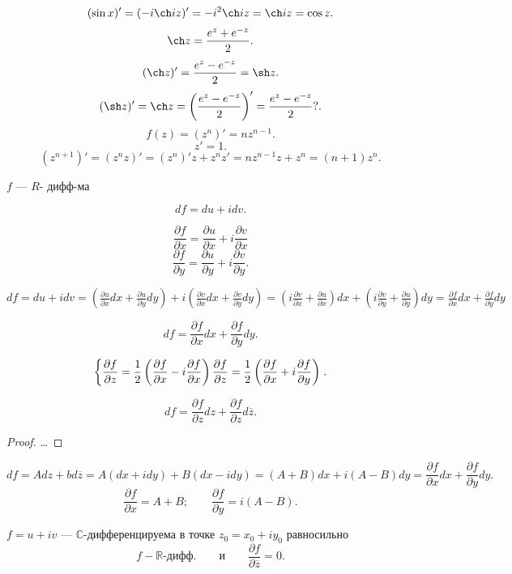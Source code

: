 \[
	(\sin x)'=(-i \ch  i z)'= - i^2 \ch i z = \ch iz= \cos z
.\] 
\[
	\ch z= \frac{e^z+e^{-z}}{2}
.\] 
\[
	(\ch z)'=\frac{e^z - e^{-z}}{2}=\sh z
.\] 
\[
	(\sh z)'=\ch z = \left( \frac{e^z-e^{-z}}{2} \right) '=
	\frac{e^z-e^{-z}}{2}?
.\]
\[
	f(z)=(z^n)'=n z^{n-1}
.\] 
\[
z'=1
.\] 
\[
	(z^{n+1})'=(z^n z)'=(z^n)'z+z^n z'=n z^{n-1}z+z^n=(n+1)z^n
.\] 
\begin{figure}[ht]
    \centering
    \caption{}
    \label{fig:1}
\end{figure}
\begin{dfn}
	$f$ --- $R$- дифф-ма
\end{dfn}
\begin{dfn}
	\[
	df=du+i dv
	.\] 
\end{dfn}
\begin{dfn}
	\[\frac{\partial f}{\partial x} =\frac{\partial u}{\partial x} +i \frac{\partial v}{\partial x} \]
	\[
	\frac{\partial f}{\partial y} =\frac{\partial u}{\partial y} +i \frac{\partial v}{\partial y} 
	.\] 
\end{dfn}

$df=du + idv=\left( \frac{\partial u}{\partial x} dx+
\frac{\partial u}{\partial y} dy\right) +i\left( 
\frac{\partial v}{\partial x} dx+ \frac{\partial v}{\partial y} dy\right) =\left(i \frac{\partial v}{\partial x} +\frac{\partial u}{\partial x}  \right) dx+\left(i \frac{\partial v}{\partial y} +
\frac{\partial u}{\partial y} \right) dy=\frac{\partial f}{\partial x} dx+ \frac{\partial f}{\partial y} dy$ 
\begin{thm}
	\[
	df= \frac{\partial f}{\partial x} dx+\frac{\partial f}{\partial y} dy
	.\] 
\end{thm}
\[\left\{
	\frac{\partial f}{\partial z} = \frac{1}{2}\left(\frac{\partial f}{\partial x} -i \frac{\partial f}{\partial x} \right)\\
	\frac{\partial f}{\partial z} =\frac{1}{2}\left( 
	\frac{\partial f}{\partial x} +i \frac{\partial f}{\partial y} \right) \right.
.\] 
\begin{thm}
	\[
	df=\frac{\partial f}{\partial z} dz+\frac{\partial f}{\partial z} d \overline{z}
	.\] 
\end{thm}
\begin{proof}
	\ldots
\end{proof}
\begin{thm}
	\[
		df=Adz+bd \overline{z} =A(dx+i dy)+
		B(dx-i dy)=(A+B)dx+i (A-B)dy= \frac{\partial f}{\partial x} dx+\frac{\partial f}{\partial y} dy
	.\] 
	\[
	\frac{\partial f}{\partial x} =A+B;\qquad
	\frac{\partial f}{\partial y} =i(A-B)
	.\] 
\end{thm}
\begin{dfn}
	$f=u+iv$ --- $\mathbb{C}$-дифференцируема в точке
	$z_0=x_0+iy_0$ равносильно
	\[
		f- \mathbb{R}	\text{-дифф.}\qquad
		\text{и}\qquad \frac{\partial f}{\partial \overline{z}} =0
	.\] 
\end{dfn}

